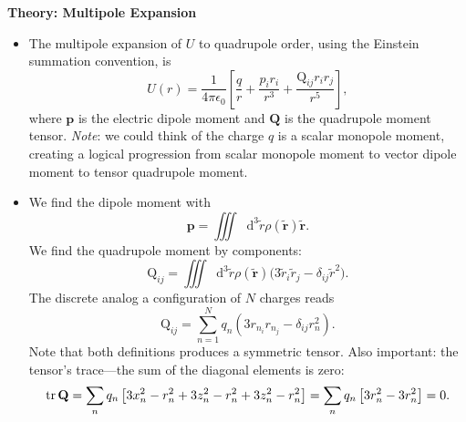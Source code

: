 \documentclass[11pt, a4paper]{article}
\newcommand{\diff}{\mathop{}\!\mathrm{d}} %
\renewcommand{\vec}[1]{\bm{#1}} %
\newcommand{\mat}[1]{\mathbf{#1}} %
\newcommand{\tvec}[1]{\tilde{\vec{#1}}} %
\newcommand{\ee}{\epsilon_{0}}  %
\begin{document}
\textbf{Theory: Multipole Expansion}
\begin{itemize}

	\item The multipole expansion of $ U $ to quadrupole order, using the Einstein summation convention, is
	\begin{equation*}
		U(r) = \frac{1}{4\pi \ee} \left[\frac{q}{r} + \frac{p_{i}r_{i}}{r^{3}} + \frac{\mathrm{Q}_{ij}r_{i}r_{j}}{r^{5}} \right],
	\end{equation*}
	where $ \vec{p} $ is the electric dipole moment and $ \mat{Q} $ is the quadrupole moment tensor. \textit{Note}: we could think of the charge $ q $ is a scalar monopole moment, creating a logical progression from scalar monopole moment to vector dipole moment to tensor quadrupole moment. 
	
	\item We find the dipole moment with 
	\begin{equation*}
		\vec{p} = \iiint  \diff^{3} \tilde{r} \rho(\tvec{r}) \tvec{r}.
	\end{equation*}
	We find the quadrupole moment by components:
	\begin{equation*}
		\mathrm{Q}_{ij} = \iiint  \diff^{3} \tilde{r} \rho(\tvec{r}) \big( 3\tilde{r}_{i}\tilde{r}_{j} - \delta_{ij}\tilde{r}^{2} \big).
	\end{equation*}
	The discrete analog a configuration of $ N $ charges reads
	\begin{equation*}
		\mathrm{Q}_{ij} = \sum_{n=1}^{N} q_{n} \left(3r_{n_{i}}r_{n_{j}} - \delta_{ij}r_{n}^{2}\right).
	\end{equation*}
	Note that both definitions produces a symmetric tensor. Also important: the tensor's trace---the sum of the diagonal elements is zero:
	\begin{equation*}
		\tr\mat{Q} = \sum_{n} q_{n}\left[3x_{n}^{2} - r_{n}^{2} + 3z_{n}^{2} - r_{n}^{2} + 3z_{n}^{2} - r_{n}^{2} \right] = \sum_{n}q_{n}\left[3r_{n}^{2} - 3r_{n}^{2}\right] = 0.
	\end{equation*}
\end{itemize}
\end{document}
